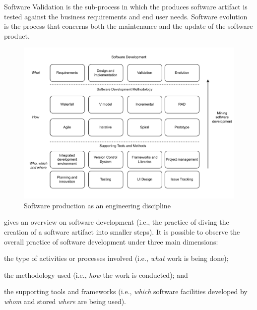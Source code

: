 Software Validation is the sub-process in which the produces software artifact is tested against the business requirements and end user needs. Software evolution is the process that concerns both the maintenance and the update of the software product. 



\begin{figure}
	\centering
	\includegraphics[width=\linewidth]{figures/SoftwareBigPic2}
	\caption{Software production as an engineering discipline}
	\label{fig:soft-eng}
\end{figure}




 gives an overview on software development (i.e., the practice of diving the creation of a software artifact into smaller steps). It is possible to observe the overall practice of software development under three main dimensions: 
\begin{inparaenum}[\itshape i)]
	\item the type of activities or processes involved (i.e., \emph{what} work is being done);
	\item the methodology used (i.e., \emph{how} the work is conducted); and 
	\item the supporting tools and frameworks (i.e., \emph{which} software facilities developed by \emph{whom} and stored \emph{where} are being used). 
\end{inparaenum}


